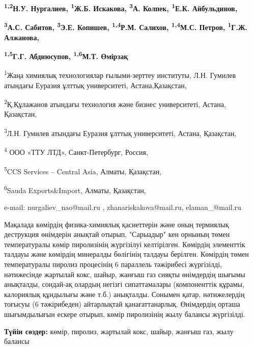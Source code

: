 
\begin{center}
{\bfseries \textsuperscript{1,2}Н.У. Нургалиев, \textsuperscript{1}Ж.Б.
Искакова, \textsuperscript{3}А. Колпек, \textsuperscript{1}Е.К.
Айбульдинов,}

{\bfseries \textsuperscript{3}А.С. Сабитов, \textsuperscript{3}Э.Е.
Копишев, \textsuperscript{1,4}Р.М. Салихов, \textsuperscript{1,4}М.С.
Петров, \textsuperscript{1}Г.Ж. Алжанова,}

{\bfseries \textsuperscript{1,5}Г.Г. Абдиюсупов, \textsuperscript{1,6}М.Т.
Өмірзақ}

\textsuperscript{1}Жаңа химиялық технологиялар ғылыми-зерттеу институты,
Л.Н. Гумилев атындағы Еуразия ұлттық университеті, Астана,Қазақстан,

\textsuperscript{2}Қ.Құлажанов атындағы технология және бизнес
университеті, Астана, Қазақстан,

\textsuperscript{3}Л.Н. Гумилев атындағы Еуразия ұлттық университеті,
Астана, Қазақстан,

\textsuperscript{4} ООО «ТТУ ЛТД», Санкт-Петербург, Россия,

\textsuperscript{5}CCS Services -- Central Asia, Алматы, Қазақстан,

\textsuperscript{6}Sauda Exports\&Import, Алматы, Қазақстан,

e-mail: nurgaliev\_nao@mail.ru , zhanariskakova@mail.ru,
elaman\_@mail.ru
\end{center}

Мақалада көмірдің физика-химиялық қасиеттерін және оның термиялық
деструкция өнімдерін анықтай отырып, "Сарыадыр" кен орнының төмен
температуралы көмір пиролизінің жүргізілуі келтірілген. Көмірдің
элементтік талдауы және көмірдің минералды бөлігінің талдауы берілген.
Көмірдің төмен температуралы пиролиз процесінің 6 параллель тәжірибесі
жүргізілді, нәтижесінде жартылай кокс, шайыр, жанғыш газ сияқты
өнімдердің шығымы анықталды, сондай-ақ олардың негізгі сипаттамалары
(компоненттік құрамы, калориялық құндылығы және т.б.) анықталды. Сонымен
қатар, нәтижелердің тоғысуы (6 тәжірибеден) айтарлықтай қанағаттанарлық.
Өнімдердің орташа шығымдылығын ескере отырып, көмір пиролизінің жылу
балансы жүргізілді.

{\bfseries Түйін сөздер:} көмір, пиролиз, жартылай кокс, шайыр, жанғыш газ,
жылу балансы


